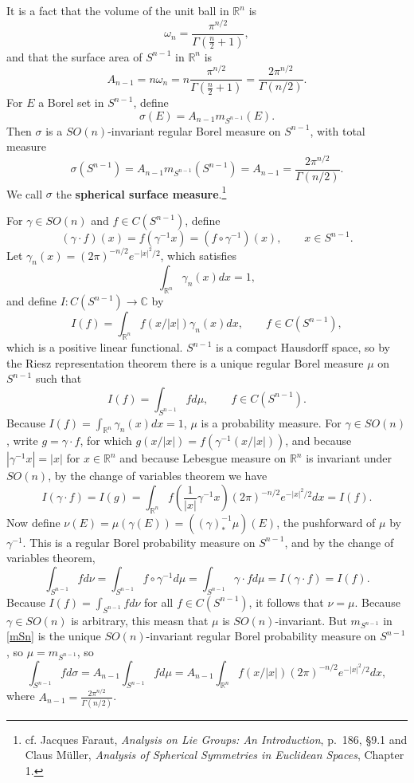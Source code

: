 \documentclass{article}
\theoremstyle{definition}
\theoremstyle{definition}
\begin{document}
It is a fact that  the volume of the unit ball in $\mathbb{R}^n$ is
\[
\omega_n = \frac{\pi^{n/2}}{\Gamma\left(\frac{n}{2}+1\right)},
\]
and that 
the surface area of $S^{n-1}$ in $\mathbb{R}^n$ is
\[
A_{n-1}= n \omega_n = n \frac{\pi^{n/2}}{\Gamma\left(\frac{n}{2}+1\right)} 
=\frac{2\pi^{n/2}}{\Gamma(n/2)}.
\]
For $E$ a Borel set in $S^{n-1}$, define
\[
\sigma(E) = A_{n-1} m_{S^{n-1}}(E).
\]
Then $\sigma$ is a $SO(n)$-invariant regular Borel measure on $S^{n-1}$, with total measure
\[
\sigma(S^{n-1}) = A_{n-1} m_{S^{n-1}}(S^{n-1}) = 
A_{n-1} = \frac{2\pi^{n/2}}{\Gamma(n/2)}.
\]
We call $\sigma$ the \textbf{spherical surface measure}.\footnote{cf. Jacques Faraut, 
{\em Analysis on Lie Groups: An Introduction}, p.~186, \S 9.1 
and Claus M\"uller, 
{\em Analysis of Spherical Symmetries in Euclidean Spaces},
Chapter 1.}


For $\gamma \in SO(n)$ and $f \in C(S^{n-1})$, define
\[
(\gamma \cdot f)(x) = f(\gamma^{-1} x)=(f \circ \gamma^{-1})(x),\qquad x \in S^{n-1}.
\]
Let $\gamma_n(x) = (2\pi)^{-n/2} e^{-|x|^2/2}$, which satisfies
\[
\int_{\mathbb{R}^n} \gamma_n(x) dx = 1,
\]
and define $I:C(S^{n-1}) \to \mathbb{C}$ by
\[
I(f)= \int_{\mathbb{R}^n} f(x/|x|) \gamma_n(x) dx, \qquad f \in C(S^{n-1}),
\]
which is a positive linear functional.
$S^{n-1}$ is a compact Hausdorff space, so by the Riesz representation theorem there is a unique regular Borel measure
$\mu$ on $S^{n-1}$ such that 
\[
I(f) = \int_{S^{n-1}} f d\mu,\qquad f \in C(S^{n-1}).
\]
Because $I(f) = \int_{\mathbb{R}^n} \gamma_n(x) dx = 1$, $\mu$ is a probability measure. For $\gamma \in SO(n)$,
write
$g= \gamma \cdot f$, for which 
$g(x/|x|) = f(\gamma^{-1} (x/|x|))$, and because $|\gamma^{-1} x|=|x|$ for $x \in \mathbb{R}^n$ and because Lebesgue measure on $\mathbb{R}^n$
is invariant under $SO(n)$, by the change of variables
theorem we have
\[
I(\gamma \cdot f) = I(g) = \int_{\mathbb{R}^n} f\left(\frac{1}{|x|} \gamma^{-1} x\right)  (2\pi)^{-n/2} e^{-|x|^2/2} dx
=I(f).
\]
Now define $\nu(E) = \mu(\gamma(E))=((\gamma)^{-1}_* \mu)(E)$, the pushforward of $\mu$ by $\gamma^{-1}$.  This is a regular Borel probability measure on $S^{n-1}$, and by the
change of variables theorem,
\[
\int_{S^{n-1}} f d\nu = \int_{S^{n-1}} f \circ \gamma^{-1} d\mu = 
\int_{S^{n-1}} \gamma \cdot f d\mu
=I(\gamma \cdot f) = I(f).
\]
Because $I(f) = \int_{S^{n-1}} f d\nu$ for all $f \in C(S^{n-1})$, it follows that $\nu = \mu$. 
Because $\gamma \in SO(n)$ is arbitrary, this measn that $\mu$ is $SO(n)$-invariant. 
But $m_{S^{n-1}}$ in \eqref{mSn} is the unique $SO(n)$-invariant regular Borel probability measure on $S^{n-1}$, so
$\mu = m_{S^{n-1}}$, so
\[
\int_{S^{n-1}} f d\sigma = A_{n-1} \int_{S^{n-1}} f d\mu
=A_{n-1} \int_{\mathbb{R}^n} f(x/|x|) (2\pi)^{-n/2} e^{-|x|^2/2} dx,
\]
where $A_{n-1} = \frac{2\pi^{n/2}}{\Gamma(n/2)}$.
\end{document}
